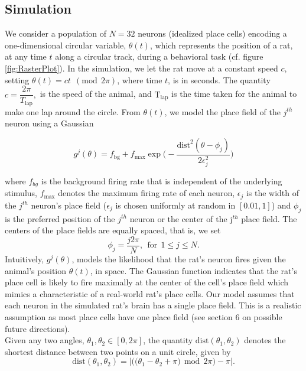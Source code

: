 \subsection{Simulation}
We consider a population of $N=32$  neurons (idealized place cells) encoding a 
one-dimensional circular  variable, $\theta(t)$, which represents 
the position of a rat, at any time $t$ along a circular track, during a behavioral task  (cf.  figure \ref{fig:RasterPlot}).
In the simulation, we let the rat move at a constant speed $c$, setting  $\theta(t) = c t \ \ (\text{mod} \ \ 2\pi)$, where time $t$, is in seconds. The quantity  $c = \dfrac{2\pi}{T_{\text{lap}}},$ is the speed of the animal, and
$\text{T}_{\text{lap}}$ is the time taken for the animal to make one lap around the circle.
From  $\theta(t)$,  we model the place field of the $j^{th}$ neuron using a Gaussian 

\begin{equation}
{g}^{j}(\theta) = \displaystyle  f_{\text{bg}} + f_{\max} 
\exp\bigg(-\dfrac{\text{dist}^{2}(\theta - \phi_{j})}{2\epsilon_{j}^{2}} \bigg)
\end{equation}

where $f_{bg}$ is the background firing rate that is independent of the underlying stimulus, $f_{\max}$ denotes the maximum firing rate of each neuron, $\epsilon_j $  is the width of the $j^{th}$ neuron's place field ($\epsilon_j$ is chosen uniformly at random in  $[0.01, 1]$)  and $\phi_{j}$ is the preferred position of the $j^{th}$  neuron or the center of the j$^{th}$ place field. The centers of the place fields are equally spaced, that is, we set
$$\phi_j = \frac{j2\pi}{N}, \ \    \text{for}   \ \    1 \leq j \leq N.$$
Intuitively, $g^{j}(\theta)$, models  the likelihood that the rat's neuron fires given the animal's position $\theta(t)$, in space.
The Gaussian function indicates that the rat's place cell is  likely to fire maximally  at the center of the cell's place field
which mimics a characteristic  of a real-world rat's place cells.
Our model assumes that each neuron in the simulated rat's brain has a single place field. This is a realistic assumption as 
most place cells have one place field (see section 6 on possible future directions). \\

Given any two angles, $\theta_{1}, \theta_{2} \in [0, 2\pi]$, the quantity
$\text{dist}(\theta_{1}, \theta_{2})$ denotes the shortest distance between 
two points on a unit circle, given by
\[
\text{dist}(\theta_{1}, \theta_{2}) =  \left | \big( \big( \theta_{1} - \theta_{2} + \pi  \big) \ \ \text{mod} \ \ 2\pi \big) - \pi \right|.
\]

